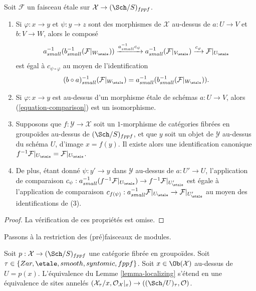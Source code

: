 \begin{lemma}
\label{lemma-comparison}
Soit $\mathcal{F}$ un faisceau \'etale sur $\mathcal{X} \to (\Sch/S)_{fppf}$.
\begin{enumerate}
\item Si $\varphi : x \to y$ et $\psi : y \to z$
sont des morphismes de $\mathcal{X}$ au-dessus de $a : U \to V$ et
$b : V \to W$, alors le composé
$$
a_{small}^{-1}(b_{small}^{-1} (\mathcal{F}|_{W_\etale}))
\xrightarrow{a_{small}^{-1}c_\psi}
a_{small}^{-1}(\mathcal{F}|_{V_\etale})
\xrightarrow{c_\varphi}
\mathcal{F}|_{U_\etale}
$$
est égal à $c_{\psi \circ \varphi}$ au moyen de l'identification
$$
(b \circ a)_{small}^{-1}(\mathcal{F}|_{W_\etale}) =
a_{small}^{-1}(b_{small}^{-1} (\mathcal{F}|_{W_\etale})).
$$
\item Si $\varphi : x \to y$ est au-dessus d'un morphisme \'etale de schémas
$a : U \to V$, alors (\ref{equation-comparison}) est un isomorphisme.
\item Supposons que $f : \mathcal{Y} \to \mathcal{X}$ soit un $1$-morphisme de
catégories fibrées en groupoïdes au-dessus de $(\Sch/S)_{fppf}$, et que $y$ soit
un objet de $\mathcal{Y}$ au-dessus du schéma $U$, d'image
$x = f(y)$. Il existe alors une identification canonique
$f^{-1}\mathcal{F}|_{U_\etale} = \mathcal{F}|_{U_\etale}$.
\item De plus, étant donné $\psi : y' \to y$ dans $\mathcal{Y}$ au-dessus de
$a : U' \to U$, l'application de comparaison
$c_\psi : a_{small}^{-1}(f^{-1}\mathcal{F}|_{U_\etale}) \to
f^{-1}\mathcal{F}|_{U'_\etale}$ est égale à
l'application de comparaison $c_{f(\psi)} : a_{small}^{-1}\mathcal{F}|_{U_\etale}
\to \mathcal{F}|_{U'_\etale}$ au moyen des identifications de (3).
\end{enumerate}
\end{lemma}

\begin{proof}
La vérification de ces propriétés est omise.
\end{proof}

\noindent
Passons à la restriction des (pré)faisceaux de modules.

\begin{lemma}
\label{lemma-localizing-structure-sheaf}
Soit $p : \mathcal{X} \to (\Sch/S)_{fppf}$ une catégorie fibrée
en groupoïdes. Soit $\tau \in \{Zar, \etale, smooth, syntomic, fppf\}$.
Soit $x \in \Ob(\mathcal{X})$ au-dessus de $U = p(x)$.
L'équivalence du
Lemme \ref{lemma-localizing}
s'étend en une équivalence de sites annelés
$(\mathcal{X}_\tau/x, \mathcal{O}_\mathcal{X}|_x) \to
((\Sch/U)_\tau, \mathcal{O})$.
\end{lemma}

